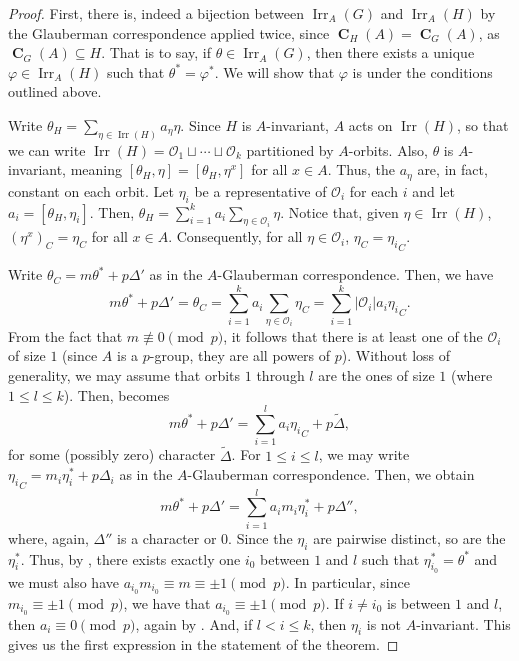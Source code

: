 \documentclass[12pt]{amsart}
\DeclareMathOperator{\CB}{\mathbf{C}}
\DeclareMathOperator{\Irr}{Irr}
\theoremstyle{remark}
\theoremstyle{definition}
\theoremstyle{plain}
\theoremstyle{definition}
\numberwithin{equation}{section}
\begin{document}
\begin{proof}
	First, there is, indeed a bijection between $\Irr_{A}(G)$ and $\Irr_{A}(H)$ by the Glauberman correspondence applied twice, since $\CB_H(A) = \CB_G(A)$, as $\CB_G(A) \subseteq H$. That is to say, if $\theta \in \Irr_{A}(G)$, then there exists a unique $\varphi \in \Irr_{A}(H)$ such that $\theta^* = \varphi^*$. We will show that $\varphi$ is under the conditions outlined above.
	
	Write $\theta_H = \sum_{\eta \in \Irr(H)} a_\eta \eta$. Since $H$ is $A$-invariant, $A$ acts on $\Irr(H)$, so that we can write $\Irr(H) = \mathcal{O}_1 \sqcup \cdots \sqcup \mathcal{O}_k$ partitioned by $A$-orbits. Also, $\theta$ is $A$-invariant, meaning $[\theta_H, \eta] = [\theta_H, \eta^x]$ for all $x \in A$. Thus, the $a_\eta$ are, in fact, constant on each orbit. Let $\eta_i$ be a representative of $\mathcal{O}_i$ for each $i$ and let $a_i = [\theta_H, \eta_i]$. Then, $\theta_H = \sum_{i = 1}^k a_i \sum_{\eta \in \mathcal{O}_i} \eta$. Notice that, given $\eta \in \Irr(H)$, $(\eta^x)_{C} = \eta_{C}$ for all $x \in A$. Consequently, for all $\eta \in \mathcal{O}_i$, $\eta_{C} = {\eta_i}_{C}$.
	
	Write $\theta_{C} = m\theta^* + p\Delta'$ as in the $A$-Glauberman correspondence. Then, we have
	\begin{equation}
		\label{eq1}
		m\theta^* + p\Delta' = \theta_{C} = \sum_{i = 1}^k a_i \sum_{\eta \in \mathcal{O}_i} \eta_{C} = \sum_{i = 1}^k |\mathcal{O}_i| a_i {\eta_i}_{C}.
	\end{equation}
	From the fact that $m \not \equiv 0 \pmod{p}$, it follows that there is at least one of the $\mathcal{O}_i$ of size $1$ (since $A$ is a $p$-group, they are all powers of $p$). Without loss of generality, we may assume that orbits $1$ through $l$ are the ones of size $1$ (where $1 \leq l \leq k$). Then,  becomes
	\begin{equation*}
		m\theta^* + p\Delta' = \sum_{i = 1}^l a_i {\eta_i}_{C} + p \tilde{\Delta},
	\end{equation*}
	for some (possibly zero) character $\tilde{\Delta}$. For $1 \leq i \leq l$, we may write ${\eta_i}_{C} = m_i\eta_i^* + p\Delta_i$ as in the $A$-Glauberman correspondence. Then, we obtain
	\begin{equation}
		\label{eq2}
		m\theta^* + p\Delta' = \sum_{i = 1}^l a_i m_i\eta_i^*+ p \Delta'',
	\end{equation}
	where, again, $\Delta''$ is a character or $0$. Since the $\eta_i$ are pairwise distinct, so are the $\eta_i^*$. Thus, by , there exists exactly one $i_0$ between $1$ and $l$ such that $\eta_{i_0}^* = \theta^*$ and we must also have $a_{i_0} m_{i_0} \equiv m \equiv \pm 1 \pmod{p}$. In particular, since $m_{i_0} \equiv \pm 1 \pmod{p}$, we have that $a_{i_0} \equiv \pm 1 \pmod{p}$. If $i \neq i_0$ is between $1$ and $l$, then $a_i \equiv 0 \pmod{p}$, again by . And, if $l < i \leq k$, then $\eta_i$ is not $A$-invariant. This gives us the first expression in the statement of the theorem.
	

\end{proof}
\end{document}
